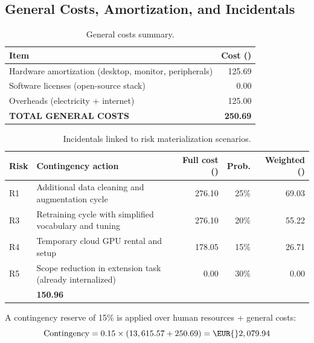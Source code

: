 \documentclass[11pt, a4paper]{article}
\begin{document}
\subsection{General Costs, Amortization, and Incidentals}
\begin{table}[h!]
    \centering
    \caption{General costs summary.}
    \label{tab:general-costs}
    \renewcommand{\arraystretch}{1.1}
    \begin{tabularx}{\linewidth}{X r}
        \toprule
        \textbf{Item} & \textbf{Cost (\EUR{})} \\
        \midrule
        Hardware amortization (desktop, monitor, peripherals) & 125.69 \\
        Software licenses (open-source stack) & 0.00 \\
        Overheads (electricity + internet) & 125.00 \\
        \midrule
        \textbf{TOTAL GENERAL COSTS} & \textbf{250.69} \\
        \bottomrule
    \end{tabularx}
\end{table}

\begin{table}[h!]
    \centering
    \caption{Incidentals linked to risk materialization scenarios.}
    \label{tab:incidentals}
    \renewcommand{\arraystretch}{1.1}
    \scriptsize
    \begin{tabularx}{\linewidth}{>{\raggedright}p{1.0cm} >{\raggedright}p{4.2cm} r r r}
        \toprule
        \textbf{Risk} & \textbf{Contingency action} & \textbf{Full cost (\EUR{})} & \textbf{Prob.} & \textbf{Weighted (\EUR{})} \\
        \midrule
        R1 & Additional data cleaning and augmentation cycle & 276.10 & 25\% & 69.03 \\
        R3 & Retraining cycle with simplified vocabulary and tuning & 276.10 & 20\% & 55.22 \\
        R4 & Temporary cloud GPU rental and setup & 178.05 & 15\% & 26.71 \\
        R5 & Scope reduction in extension task (already internalized) & 0.00 & 30\% & 0.00 \\
        \midrule
        \multicolumn{4}{r}{\textbf{TOTAL INCIDENTALS}} & \textbf{150.96} \\
        \bottomrule
    \end{tabularx}
\end{table}

A contingency reserve of 15\% is applied over human resources + general costs:
\[
\text{Contingency} = 0.15 \times (13,615.57 + 250.69) = \EUR{}2,079.94
\]
\end{document}
